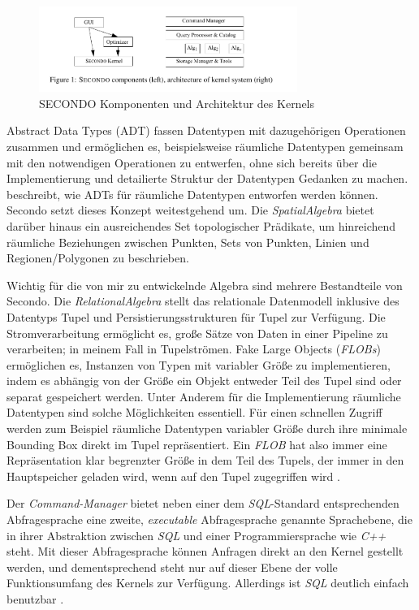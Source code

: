 \documentclass[a4paper,12pt,twoside]{article}
\newcommand{\Fb}[1]{\textit{#1}} %
\begin{document}
\begin{figure}
	\centering
	\includegraphics[width=0.75\textwidth]{Bilder/secondo.png}
	\caption{SECONDO Komponenten und Architektur des Kernels \parencite{Gueting2010}}
	\label{img:secondo}
\end{figure}

Abstract Data Types (ADT) fassen Datentypen mit dazugehörigen Operationen zusammen und ermöglichen es, beispielsweise räumliche Datentypen gemeinsam mit den notwendigen Operationen zu entwerfen, ohne sich bereits über die Implementierung und detailierte Struktur der Datentypen Gedanken zu machen. {\textcite[S. 75ff]{Rigaux2001}} beschreibt, wie ADTs für räumliche Datentypen entworfen werden können. Secondo setzt dieses Konzept weitestgehend um. Die \Fb{SpatialAlgebra} bietet darüber hinaus ein ausreichendes Set topologischer Prädikate, um hinreichend räumliche Beziehungen zwischen Punkten, Sets von Punkten, Linien und Regionen/Polygonen zu beschrieben.

Wichtig für die von mir zu entwickelnde Algebra sind mehrere Bestandteile von Secondo. Die \Fb{RelationalAlgebra} stellt das relationale Datenmodell inklusive des Datentyps Tupel und Persistierungsstrukturen für Tupel zur Verfügung. Die Stromverarbeitung ermöglicht es, große Sätze von Daten in einer Pipeline zu verarbeiten; in meinem Fall in Tupelströmen. Fake Large Objects (\Fb{FLOBs}) ermöglichen es, Instanzen von Typen mit variabler Größe zu implementieren, indem es abhängig von der Größe ein Objekt entweder Teil des Tupel sind oder separat gespeichert werden. Unter Anderem für die Implementierung räumliche Datentypen sind solche Möglichkeiten essentiell. Für einen schnellen Zugriff werden zum Beispiel räumliche Datentypen variabler Größe durch ihre minimale Bounding Box direkt im Tupel repräsentiert. Ein \Fb{FLOB} hat also immer eine Repräsentation klar begrenzter Größe in dem Teil des Tupels, der immer in den Hauptspeicher geladen wird, wenn auf den Tupel zugegriffen wird \parencite{Gueting2010}.

Der \Fb{Command-Manager} bietet neben einer dem \Fb{SQL}-Standard entsprechenden Abfragesprache eine zweite, \Fb{executable} Abfragesprache genannte Sprachebene, die in ihrer Abstraktion zwischen \Fb{SQL} und einer Programmiersprache wie \Fb{C++} steht. Mit dieser Abfragesprache können Anfragen direkt an den Kernel gestellt werden, und dementsprechend steht nur auf dieser Ebene der volle Funktionsumfang des Kernels zur Verfügung. Allerdings ist \Fb{SQL} deutlich einfach benutzbar \parencite{Gueting2010}. 
\end{document}
